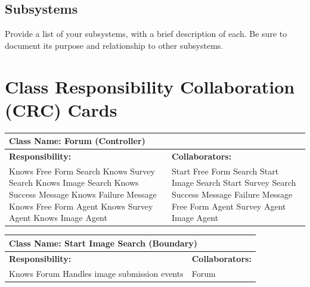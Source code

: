 \documentclass[]{article}
\begin{document}
\subsection{Subsystems}
\label{sub:subsystems}
 Provide a list of your subsystems, with a brief description of each. Be sure to document its purpose and relationship to other subsystems.


	
\section{Class Responsibility Collaboration (CRC) Cards}
\label{sec:class_responsibility_collaboration_crc_cards}
	\begin{table}[H]
		\centering
		\begin{tabular}{|p{7cm}|p{7cm}|}
		\hline 
		 \multicolumn{2}{|l|}{\textbf{Class Name: Forum (Controller)}} \\
		\hline
		\textbf{Responsibility:} & \textbf{Collaborators:} \\
		\hline
		Knows Free Form Search \newline
		Knows Survey Search \newline
		Knows Image Search \newline
		Knows Success Message \newline
		Knows Failure Message \newline
		Knows Free Form Agent \newline
		Knows Survey Agent \newline
		Knows Image Agent & 		
		Start Free Form Search \newline
		Start Image Search \newline
		Start Survey Search \newline
		Success Message \newline
		Failure Message \newline
		Free Form Agent \newline
		Survey Agent \newline
		Image Agent \\
		\hline
		\end{tabular}
	\end{table}		
	\begin{table}[H]
		\centering
		\begin{tabular}{|p{7cm}|p{7cm}|}
		\hline 
		 \multicolumn{2}{|l|}{\textbf{Class Name: Start Image Search (Boundary)}} \\
		\hline
		\textbf{Responsibility:} & \textbf{Collaborators:} \\
		\hline
		Knows Forum \newline
		Handles image submission events & Forum \\
		\hline
		\end{tabular}
	\end{table}
\end{document}
